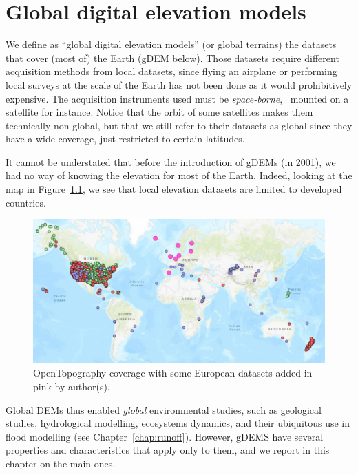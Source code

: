 
\setchapterpreamble[u]{\margintoc}
\graphicspath{{gdem/figs/}}


\chapter{Global digital elevation models}%
\label{chap:gdem}

We define as ``global digital elevation models'' (or global terrains) the datasets that cover (most of) the Earth (gDEM below).%
Those datasets require different acquisition methods from local datasets, since flying an airplane or performing local surveys at the scale of the Earth has not been done as it would prohibitively expensive.
The acquisition instruments used must be \emph{space-borne}, \ie\ mounted on a satellite for instance.
Notice that the orbit of some satellites makes them technically non-global, but that we still refer to their datasets as global since they have a wide coverage, just restricted to certain latitudes.

It cannot be understated that before the introduction of gDEMs (in 2001), we had no way of knowing the elevation for most of the Earth.
Indeed, looking at the map in Figure~\ref{fig:dem_coverage}, we see that local elevation datasets are limited to developed countries.

\begin{figure}
  \centering
  \includegraphics[width=\linewidth]{opentopography.pdf}
  \caption{OpenTopography coverage with some European datasets added in pink by author(s).} %
  \label{fig:dem_coverage}
\end{figure}

Global DEMs thus enabled \emph{global} environmental studies, such as geological studies, hydrological modelling, ecosystems dynamics, and their ubiquitous use in flood modelling (see Chapter~\ref{chap:runoff}).
However, gDEMS have several properties and characteristics that apply only to them, and we report in this chapter on the main ones.


